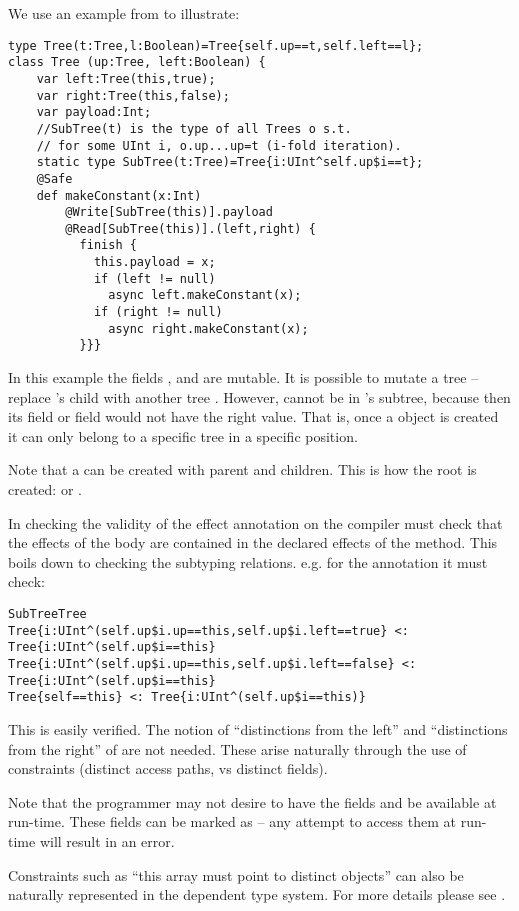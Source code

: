 We use an example from \cite{DPJ} to illustrate:
  \begin{lstlisting}
type Tree(t:Tree,l:Boolean)=Tree{self.up==t,self.left==l};
class Tree (up:Tree, left:Boolean) {
    var left:Tree(this,true);
    var right:Tree(this,false);
    var payload:Int;
    //SubTree(t) is the type of all Trees o s.t. 
    // for some UInt i, o.up...up=t (i-fold iteration).
    static type SubTree(t:Tree)=Tree{i:UInt^self.up$i==t};
    @Safe
    def makeConstant(x:Int)
        @Write[SubTree(this)].payload
        @Read[SubTree(this)].(left,right) {
          finish {
            this.payload = x; 
            if (left != null)
              async left.makeConstant(x); 
            if (right != null) 
              async right.makeConstant(x); 
          }}}
  \end{lstlisting}
In this example the fields , and 
are mutable. It is possible to mutate a tree  -- replace
's  child with another tree . However,  cannot be in
's  subtree, because then its  field or
 field would not have the right value. That is, once a
 object is created it can only belong to a specific tree in
a specific position.

Note that a  can be created with  parent and
children. This is how the root is created:
 or .

In checking the validity of the effect annotation on
 the compiler must check that the effects of the
body are contained in the declared effects of the method. This boils
down to checking the subtyping relations. e.g.{} for the  annotation it must check:
\begin{lstlisting}
SubTreeTree
Tree{i:UInt^(self.up$i.up==this,self.up$i.left==true} <: Tree{i:UInt^(self.up$i==this}
Tree{i:UInt^(self.up$i.up==this,self.up$i.left==false} <: Tree{i:UInt^(self.up$i==this}
Tree{self==this} <: Tree{i:UInt^(self.up$i==this)}
\end{lstlisting}

This is easily verified.
The notion of ``distinctions from the left'' and ``distinctions from
the right'' of \cite{DPJ} are not needed. These arise naturally
through the use of constraints (distinct access paths, vs distinct fields).

Note that the programmer may not desire to have the fields 
and  be available at run-time. These fields can be marked
as  -- any attempt to access them at run-time will result
in an error. 

Constraints such as ``this array must point to distinct objects'' can
also be naturally represented in the dependent type system. For more
details please see \cite{effects-constrained-types}.




